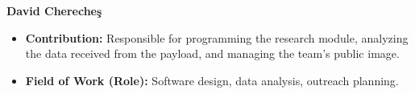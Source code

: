 \item[] \textbf{David Chereche\c{s}}
    \begin{itemize}[label=]
        \item[\faEdit] \textbf{Contribution:} Responsible for programming the research module, analyzing the data received from the payload, and managing the team’s public image.
        \item[\faMicroscope] \textbf{Field of Work (Role):} Software design, data analysis, outreach planning.
    \end{itemize}
    \vspace{0.2 cm}
    